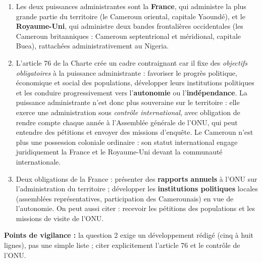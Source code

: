 \documentclass[11pt]{article}
\begin{document}
\begin{corrige}
\begin{enumerate}
\item Les deux puissances administrantes sont la \textbf{France}, qui administre la plus grande partie du territoire (le Cameroun oriental, capitale Yaoundé), et le \textbf{Royaume-Uni}, qui administre deux bandes frontalières occidentales (les Cameroun britanniques : Cameroun septentrional et méridional, capitale Buea), rattachées administrativement au Nigeria.
\item L'article 76 de la Charte crée un cadre contraignant car il fixe des \emph{objectifs obligatoires} à la puissance administrante : favoriser le progrès politique, économique et social des populations, développer leurs institutions politiques et les conduire progressivement vers l'\textbf{autonomie} ou l'\textbf{indépendance}. La puissance administrante n'est donc plus souveraine sur le territoire : elle exerce une administration sous \emph{contrôle international}, avec obligation de rendre compte chaque année à l'Assemblée générale de l'ONU, qui peut entendre des pétitions et envoyer des missions d'enquête. Le Cameroun n'est plus une possession coloniale ordinaire : son statut international engage juridiquement la France et le Royaume-Uni devant la communauté internationale.
\item Deux obligations de la France : présenter des \textbf{rapports annuels} à l'ONU sur l'administration du territoire ; développer les \textbf{institutions politiques} locales (assemblées représentatives, participation des Camerounais) en vue de l'autonomie. On peut aussi citer : recevoir les pétitions des populations et les missions de visite de l'ONU.
\end{enumerate}
\textbf{Points de vigilance :} la question 2 exige un développement rédigé (cinq à huit lignes), pas une simple liste ; citer explicitement l'article 76 et le contrôle de l'ONU.
\end{corrige}
\end{document}
